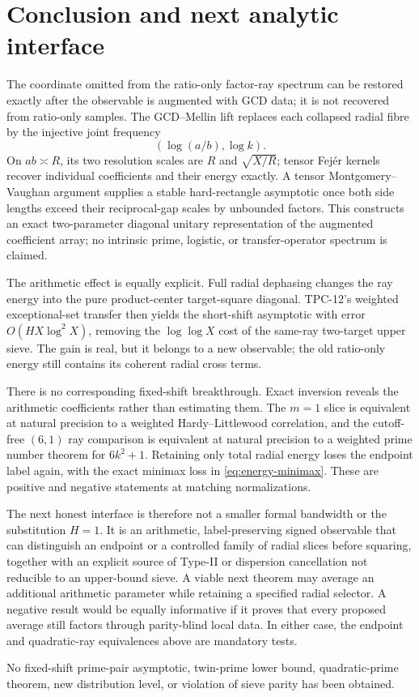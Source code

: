 \section{Conclusion and next analytic interface}
\label{sec:conclusion}

The coordinate omitted from the ratio-only factor-ray spectrum can be
restored exactly after the observable is augmented with GCD data; it is
not recovered from ratio-only samples.  The GCD--Mellin lift replaces each collapsed radial fibre by
the injective joint frequency
\[
 (\log(a/b),\log k).
\]
On $ab\asymp R$, its two resolution scales are $R$ and
$\sqrt{X/R}$; tensor Fej\'er kernels recover individual coefficients and
their energy exactly.  A tensor Montgomery--Vaughan argument supplies a
stable hard-rectangle asymptotic once both side lengths exceed their
reciprocal-gap scales by unbounded factors.  This constructs an exact
two-parameter diagonal unitary representation of the augmented
coefficient array; no intrinsic prime, logistic, or transfer-operator
spectrum is claimed.

The arithmetic effect is equally explicit.  Full radial dephasing
changes the ray energy into the pure product-center target-square
diagonal.  TPC-12's weighted exceptional-set transfer then yields the
short-shift asymptotic with error $O(HX\log^2X)$, removing the
$\log\log X$ cost of the same-ray two-target upper sieve.  The gain is
real, but it belongs to a new observable; the old ratio-only energy still
contains its coherent radial cross terms.

There is no corresponding fixed-shift breakthrough.  Exact inversion
reveals the arithmetic coefficients rather than estimating them.  The
$m=1$ slice is equivalent at natural precision to a weighted
Hardy--Littlewood correlation, and the cutoff-free $(6,1)$ ray
comparison is equivalent at natural precision to a weighted prime
number theorem for $6k^2+1$.
Retaining only total radial energy loses the endpoint label again, with
the exact minimax loss in \eqref{eq:energy-minimax}.  These are positive
and negative statements at matching normalizations.

The next honest interface is therefore not a smaller formal bandwidth or
the substitution $H=1$.  It is an arithmetic, label-preserving signed
observable that can distinguish an endpoint or a controlled family of
radial slices before squaring, together with an explicit source of
Type-II or dispersion cancellation not reducible to an upper-bound
sieve.  A viable next theorem may average an additional arithmetic
parameter while retaining a specified radial selector.  A negative
result would be equally informative if it proves that every proposed
average still factors through parity-blind local data.  In either case,
the endpoint and quadratic-ray equivalences above are mandatory tests.

No fixed-shift prime-pair asymptotic, twin-prime lower bound,
quadratic-prime theorem, new distribution level, or violation of sieve
parity has been obtained.

